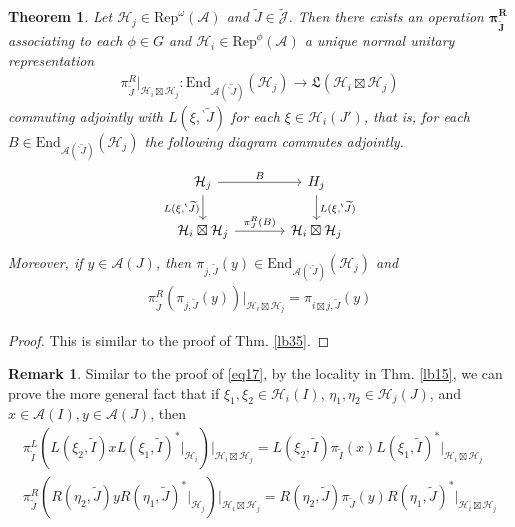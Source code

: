 \documentclass[11pt,b5paper,notitlepage]{article}
\theoremstyle{definition}
\newtheorem{rem}[df]{Remark}
\theoremstyle{plain}
\newtheorem{thm}[df]{Theorem}
\newcommand{\fk}{\mathfrak}
\newcommand{\mc}{\mathcal}
\newcommand{\wtd}{\widetilde}
\newcommand{\End}{\mathrm{End}} %
\newcommand{\Rep}{\mathrm{Rep}}
\newcommand{\Jtd}{\widetilde{\mathcal J}}
\newcommand{\bpr}{{}^\backprime}
\newcommand{\MA}{\mathcal A}
\newcommand{\MH}{\mathcal H}
\numberwithin{equation}{section}
\begin{document}
\begin{thm}\label{lb63}
Let $\MH_j\in\Rep^\omega(\MA)$ and $\wtd J\in\Jtd$. Then there exists an operation $\pmb{\pi^R_{\wtd J}}$ associating to each $\phi\in G$ and $\MH_i\in\Rep^\phi(\MA)$ a unique normal unitary representation
\begin{align}\label{eq42}
\pi^R_{\wtd J}|_{\MH_i\boxtimes\MH_j}:\End_{\MA(\bpr\wtd J)}(\MH_j)\rightarrow \fk L(\MH_i\boxtimes\MH_j)
\end{align}
commuting adjointly with $L(\xi,\bpr\wtd J)$ for each $\xi\in\MH_i(J')$, that is, for each $B\in \End_{\MA(\bpr\wtd J)}(\MH_j)$ the following diagram commutes adjointly.
\begin{equation}\label{eq16}
\begin{tikzcd}[column sep=large]
\MH_j \arrow[r,"B"] \arrow[d,"{L(\xi,\bpr\wtd J)}"'] & \mc \MH_j \arrow[d,"{L(\xi,\bpr\wtd J)}"] \\
\MH_i\boxtimes\MH_j \arrow[r,"\pi^R_J(B)"]           & \MH_i\boxtimes\MH_j       
\end{tikzcd}
\end{equation}
Moreover, if $y\in\MA(J)$, then $\pi_{j,\wtd J}(y)\in\End_{\MA(\bpr\wtd J)}(\MH_j)$ and
\begin{align}\label{eq30}
\pi^R_{\wtd J}(\pi_{j,\wtd J}(y))\big|_{\MH_i\boxtimes\MH_j}=\pi_{i\boxtimes j,\wtd J}(y)
\end{align}
\end{thm}



\begin{proof}
This is similar to the proof of Thm. \ref{lb35}. 
\end{proof}

\begin{rem}\label{lb36}
Similar to the proof of \eqref{eq17}, by the locality in Thm. \ref{lb15}, we can prove the more general fact that if $\xi_1,\xi_2\in\MH_i(I)$, $\eta_1,\eta_2\in\MH_j(J)$, and $x\in\MA(I),y\in\MA(J)$, then
\begin{subequations}\label{eq18}
\begin{gather}
\pi^L_{\wtd I}(L(\xi_2,\wtd I)xL(\xi_1,\wtd I)^*|_{\MH_i})\big|_{\MH_i\boxtimes\MH_j}=L(\xi_2,\wtd I)\pi_{\wtd I}(x)L(\xi_1,\wtd I)^*\big|_{\MH_i\boxtimes\MH_j}\\
\pi^R_{\wtd J}(R(\eta_2,\wtd J)yR(\eta_1,\wtd J)^*|_{\MH_j})\big|_{\MH_i\boxtimes\MH_j}=R(\eta_2,\wtd J)\pi_{\wtd J}(y)R(\eta_1,\wtd J)^*\big|_{\MH_i\boxtimes\MH_j}
\end{gather}
\end{subequations}
\end{rem}
\end{document}
